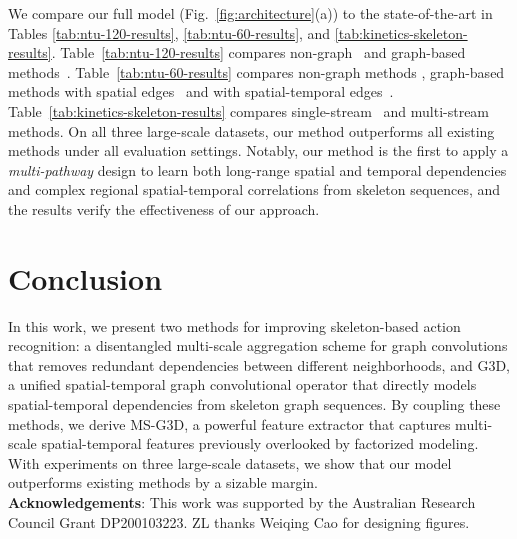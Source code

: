 \documentclass[10pt,twocolumn,letterpaper]{article}
\begin{document}
We compare our full model (Fig.~\ref{fig:architecture}(a)) to the state-of-the-art in Tables \ref{tab:ntu-120-results}, \ref{tab:ntu-60-results}, and \ref{tab:kinetics-skeleton-results}.
Table~\ref{tab:ntu-120-results} compares non-graph~\cite{st-lstm-trust-gates-skeleton-eccv2016,two-stream-attention-lstm-ntu120,rotclips-ntu120,body-pose-evolution-map-ntu-120} and graph-based methods~\cite{2s-AGCN}.
Table~\ref{tab:ntu-60-results} compares non-graph methods \cite{indrnn-skeleton, li2018co-human-skeleton-ijcai18}, graph-based methods with spatial edges~\cite{st-graph-routing-skeleton-aaai19,AS-GCN-skeleton-cvpr19,2s-AGCN,attention-gcn-lstm-cvpr2019, dgnn} and with spatial-temporal edges~\cite{GR-GCN}.
Table~\ref{tab:kinetics-skeleton-results} compares single-stream~\cite{ST-GCN, AS-GCN-skeleton-cvpr19} and multi-stream~\cite{st-graph-routing-skeleton-aaai19, 2s-AGCN, dgnn} methods. On all three large-scale datasets, our method outperforms all existing methods under all evaluation settings.
Notably, our method is the first to apply a \textit{multi-pathway} design to learn both long-range spatial and temporal dependencies and complex regional spatial-temporal correlations from skeleton sequences, and the results verify the effectiveness of our approach.
















\section{Conclusion}


In this work, we present two methods for improving skeleton-based action recognition: a disentangled multi-scale aggregation scheme for graph convolutions that removes redundant dependencies between different neighborhoods, and G3D, a unified spatial-temporal graph convolutional operator that directly models spatial-temporal dependencies from skeleton graph sequences. By coupling these methods, we derive MS-G3D, a powerful feature extractor that captures multi-scale spatial-temporal features previously overlooked by factorized modeling. With experiments on three large-scale datasets, we show that our model outperforms existing methods by a sizable margin.
\\
{\fontsize{7.5}{1} \selectfont \textbf{Acknowledgements}: This work was supported by the Australian Research Council Grant DP200103223.
ZL thanks Weiqing Cao for designing figures.}









\clearpage


{\small


}
\end{document}
